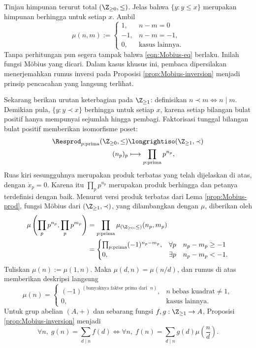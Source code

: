 \begin{example}
	Tinjau himpunan terurut total $(\Z_{\geq 0}, \leq)$. Jelas bahwa $\{y: y \leq x\}$ merupakan himpunan berhingga untuk setiap $x$. Ambil
	\[ \mu(n,m) := \begin{cases} 1, & n-m = 0 \\ -1, & n-m = -1, \\ 0, & \text{kasus lainnya}. \end{cases} \]
	Tanpa perhitungan pun segera tampak bahwa \eqref{eqn:Mobius-eq} berlaku. Inilah fungsi Möbius yang dicari. Dalam kasus khusus ini, pembaca dipersilakan menerjemahkan rumus inversi pada Proposisi \ref{prop:Mobius-inversion} menjadi prinsip pencacahan yang langsung terlihat.
\end{example}

\begin{example}[A.\ F.\ Möbius, 1832]\label{eg:Mobius-classical}
	Sekarang berikan urutan keterbagian pada $\Z_{\geq 1}$: definisikan $n \prec m \iff n \mid m$. Demikian pula, $\{y : y \prec x \}$ berhingga untuk setiap $x$, karena setiap bilangan bulat positif hanya mempunyai sejumlah hingga pembagi. Faktorisasi tunggal bilangan bulat positif memberikan isomorfisme poset:
	\begin{align*}
		\Resprod_{p: \text{prima}} (\Z_{\geq 0}, \leq) & \longrightiso (\Z_{\geq 1}, \prec) \\
		(n_p)_p & \longmapsto \prod_{p: \text{prima}} p^{n_p},
	\end{align*}
	Ruas kiri sesungguhnya merupakan produk terbatas yang telah dijelaskan di atas, dengan $\mathring{x}_p = 0$. Karena itu $\prod_p p^{n_p}$ merupakan produk berhingga dan petanya terdefinisi dengan baik. Menurut versi produk terbatas dari Lema \ref{prop:Mobius-prod}, fungsi Möbius dari $(\Z_{\geq 1}, \prec)$, yang dilambangkan dengan $\mu$, diberikan oleh
	\begin{align*}
		\mu\left( \prod_p p^{n_p}, \prod_p p^{m_p} \right) & = \prod_{p: \text{prima}} \mu_{(\Z_{\geq 0}, \leq)}(n_p, m_p) \\
		& =\begin{cases}
			\prod_{\substack{p: \text{prima}}} (-1)^{n_p - m_p}, & \forall p \quad n_p-m_p \geq -1 \\
			0, & \exists p\quad n_p - m_p < -1.
	\end{cases}\end{align*}
	Tuliskan $\mu(n) := \mu(1,n)$. Maka $\mu(d,n) = \mu(n/d)$, dan rumus di atas memberikan deskripsi langsung
	\[ \mu(n) = \begin{cases}
		(-1)^{(\text{banyaknya faktor prima dari }\; n)}, & n\; \text{bebas kuadrat} \neq 1, \\
		0, & \text{kasus lainnya}.
	\end{cases} \]
	Untuk grup abelian $(A,+)$ dan sebarang fungsi $f, g: \Z_{\geq 1} \to A$, Proposisi \ref{prop:Mobius-inversion} menjadi
	\[ \forall n,\; g(n) = \sum_{d \mid n} f(d) \iff \forall n,\; f(n) = \sum_{d \mid n} g(d) \mu\left( \frac{n}{d} \right). \]


\end{example}
